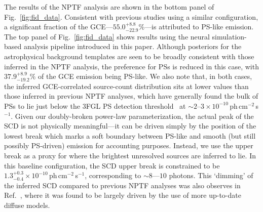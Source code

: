 \documentclass[prd,aps,10pt,nofootinbib,twocolumn,superscriptaddress,preprintnumbers,balancelastpage,longbibliography,floatfix]{revtex4-2}
\begin{document}
The results of the NPTF analysis are shown in the bottom panel of Fig.~\ref{fig:fid_data}. Consistent with previous studies using a similar configuration, a significant fraction of the GCE---$55.0^{+8.8}_{-22.9}\%$---is attributed to PS-like emission.
The top panel of Fig.~\ref{fig:fid_data} shows results using the neural simulation-based analysis pipeline introduced in this paper. Although posteriors for the astrophysical background templates are seen to be broadly consistent with those inferred in the NPTF analysis, the preference for PSs is reduced in this case, with $37.9^{+8.9}_{-19.2}\%$ of the GCE emission being PS-like. We also note that, in both cases, the inferred GCE-correlated source-count distribution sits at lower values than those inferred in previous NPTF analyses, which have generally found the bulk of PSs to lie just below the 3FGL PS detection threshold~\cite{Lee:2015fea} at $\sim2$--$3\times 10^{-10}$\,ph\,cm$^{-2}$\,s$^{-1}$. Given our doubly-broken power-law parameterization, the actual peak of the SCD is not physically meaningful---it can be driven simply by the position of the lowest break which marks a soft boundary between PS-like and smooth (but still possibly PS-driven) emission for accounting purposes. Instead, we use the upper break as a proxy for where the brightest unresolved sources are inferred to lie. In this baseline configuration, the SCD upper break is constrained to be $1.3^{+0.3}_{-0.4}\times 10^{-10}$\,ph\,cm$^{-2}$\,s$^{-1}$, corresponding to $\sim8$---$10$ photons. This `dimming' of the inferred SCD compared to previous NPTF analyses was also observes in Ref.~\cite{List:2021aer}, where it was found to be largely driven by the use of more up-to-date diffuse models.
\end{document}
